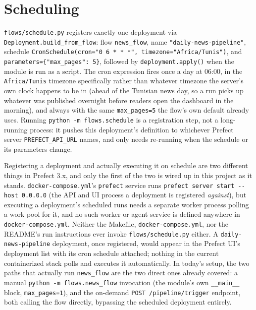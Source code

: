 \section{Scheduling}
\label{sec:scheduling}
\begin{sloppypar}
\texttt{flows/\allowbreak schedule.py} registers exactly one deployment via \texttt{Deployment.\allowbreak build\_from\_flow}: flow \texttt{news\_flow}, name \texttt{"daily-news-pipeline"}, schedule \texttt{CronSchedule(cron="0 6 * * *", timezone="Africa/Tunis")}, and \texttt{parameters=\{"max\_pages": 5\}}, followed by \texttt{deployment.apply()} when the module is run as a script. The cron expression fires once a day at 06:00, in the \texttt{Africa/Tunis} timezone specifically rather than whatever timezone the server's own clock happens to be in (ahead of the Tunisian news day, so a run picks up whatever was published overnight before readers open the dashboard in the morning), and always with the same \texttt{max\_pages=5} the flow's own default already uses. Running \texttt{python -m flows.schedule} is a registration step, not a long-running process: it pushes this deployment's definition to whichever Prefect server \texttt{PREFECT\_API\_URL} names, and only needs re-running when the schedule or its parameters change.
\end{sloppypar}

\begin{sloppypar}
Registering a deployment and actually executing it on schedule are two different things in Prefect 3.x, and only the first of the two is wired up in this project as it stands. \texttt{docker-compose.yml}'s \texttt{prefect} service runs \texttt{prefect server start -{}-host 0.0.0.0} (the API and UI process a deployment is registered \emph{against}), but executing a deployment's scheduled runs needs a separate worker process polling a work pool for it, and no such worker or agent service is defined anywhere in \texttt{docker-compose.yml}. Neither the Makefile, \texttt{docker-compose.yml}, nor the README's run instructions ever invoke \texttt{flows/\allowbreak schedule.py} either. A \texttt{daily-news-pipeline} deployment, once registered, would appear in the Prefect UI's deployment list with its cron schedule attached; nothing in the current containerized stack polls and executes it automatically. In today's setup, the two paths that actually run \texttt{news\_flow} are the two direct ones already covered: a manual \texttt{python -m flows.\allowbreak news\_flow} invocation (the module's own \texttt{\_\_main\_\_} block, \texttt{max\_pages=1}), and the on-demand \texttt{POST /pipeline/trigger} endpoint, both calling the flow directly, bypassing the scheduled deployment entirely.
\end{sloppypar}

